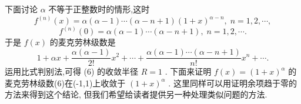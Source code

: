 下面讨论 \(\alpha\) 不等于正整数时的情形,这时
\[
{f}^{\left( n\right) }\left( x\right)  = \alpha \left( {\alpha  - 1}\right) \cdots \left( {\alpha  - n + 1}\right) {\left( 1 + x\right) }^{\alpha  - n},\;n = 1,2,\cdots ,
\]
\[
{f}^{\left( n\right) }\left( 0\right)  = \alpha \left( {\alpha  - 1}\right) \cdots \left( {\alpha  - n + 1}\right) ,\;n = 1,2,\cdots .
\]
于是 \(f\left( x\right)\) 的麦克劳林级数是
\[
1 + {\alpha x} + \frac{\alpha \left( {\alpha  - 1}\right) }{2!}{x}^{2} + \cdots  + \frac{\alpha \left( {\alpha  - 1}\right) \cdots \left( {\alpha  - n + 1}\right) }{n!}{x}^{n} + \cdots . \tag{6}
\]
运用比式判别法,可得 (6) 的收敛半径 \(R = 1\) . 下面来证明 \(f\left( x\right)  = {\left( 1 + x\right) }^{\alpha }\) 的麦克劳林级数(6)在(-1,1)上收敛于 \({\left( 1 + x\right) }^{\alpha }\) . 这里同样可以用证明余项趋于零的方法来得到这个结论, 但我们希望给读者提供另一种处理类似问题的方法.

